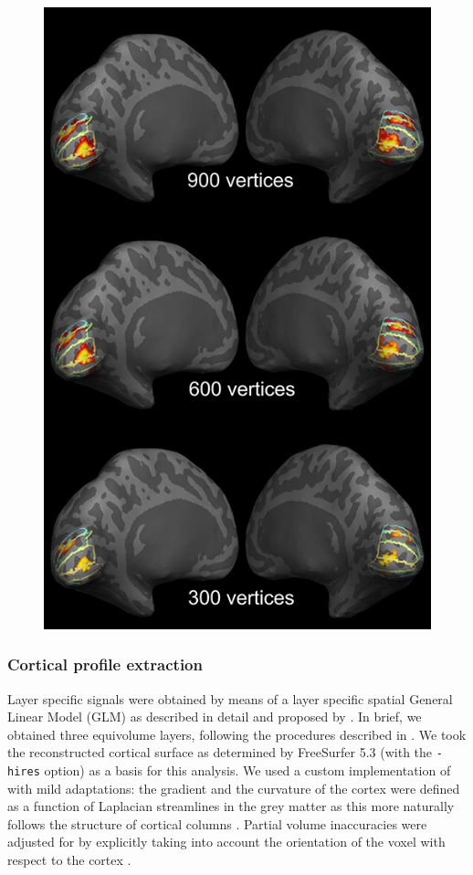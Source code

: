 \documentclass[9pt,lineno]{aperture}
\begin{document}
\begin{figure}
{\includegraphics[width=0.75\linewidth]{img/suppmat/ROI_on_surface_lowres}}
\label{figsupp:surface_plot}

\end{figure}



\subsubsection{Cortical profile extraction}
Layer specific signals were obtained by means of a layer specific spatial General Linear Model (GLM) as described in detail and proposed by \citep{VanMourik2018}. In brief, we obtained three equivolume layers, following the procedures described in \citep{Waehnert2014}. We took the reconstructed cortical surface as determined by FreeSurfer 5.3 (with the \texttt{-hires} option) \citep{Dale1999} as a basis for this analysis. We used a custom implementation of \citet{Waehnert2014} with mild adaptations: the gradient and the curvature of the cortex were defined as a function of Laplacian streamlines in the grey matter as this more naturally follows the structure of cortical columns \citep{Leprince2015}. Partial volume inaccuracies were adjusted for by explicitly taking into account the orientation of the voxel with respect to the cortex \citep{VanMourik2019}.
\end{document}
